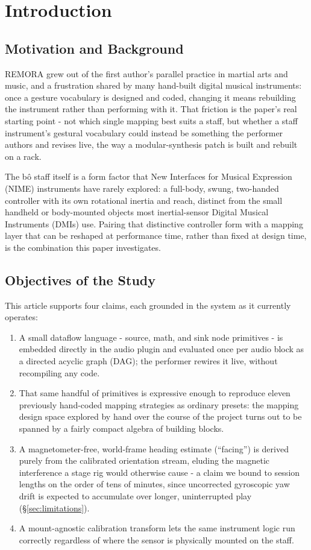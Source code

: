 \documentclass[sigconf,nonacm]{acmart}
\begin{document}
\section{Introduction}

\subsection{Motivation and Background}
REMORA grew out of the first author's parallel practice in martial arts and music, and a frustration
shared by many hand-built digital musical instruments: once a gesture vocabulary is designed and
coded, changing it means rebuilding the instrument rather than performing with it. That friction is
the paper's real starting point - not which single mapping best suits a staff, but whether a staff
instrument's gestural vocabulary could instead be something the performer authors and revises live,
the way a modular-synthesis patch is built and rebuilt on a rack.

The b\^o staff itself is a form factor that New Interfaces for Musical Expression (NIME) instruments
have rarely explored: a full-body, swung, two-handed controller with its own rotational inertia
and reach, distinct from the small handheld or body-mounted objects most inertial-sensor Digital
Musical Instruments (DMIs) use. Pairing that distinctive controller form with a
mapping layer that can be reshaped at performance time, rather than fixed at design time, is the
combination this paper investigates.

\subsection{Objectives of the Study}
This article supports four claims, each grounded in the system as it currently operates:
\begin{enumerate}
\item \label{claim:dag} A small dataflow language - source, math, and sink node primitives - is embedded directly in
the audio plugin and evaluated once per audio block as a directed acyclic graph (DAG); the performer
rewires it live, without recompiling any code.
\item \label{claim:presets} That same handful of primitives is expressive enough to reproduce eleven previously hand-coded
mapping strategies as ordinary presets: the mapping design space explored by hand over the course of
the project turns out to be spanned by a fairly compact algebra of building blocks.
\item \label{claim:facing} A magnetometer-free, world-frame heading estimate (``facing'') is derived purely from the
calibrated orientation stream, eluding the magnetic interference a stage rig would otherwise cause -
a claim we bound to session lengths on the order of tens of minutes, since uncorrected gyroscopic
yaw drift is expected to accumulate over longer, uninterrupted play (\S\ref{sec:limitations}).
\item \label{claim:calibration} A mount-agnostic calibration transform lets the same instrument logic run correctly regardless
of where the sensor is physically mounted on the staff.
\end{enumerate}
\end{document}
